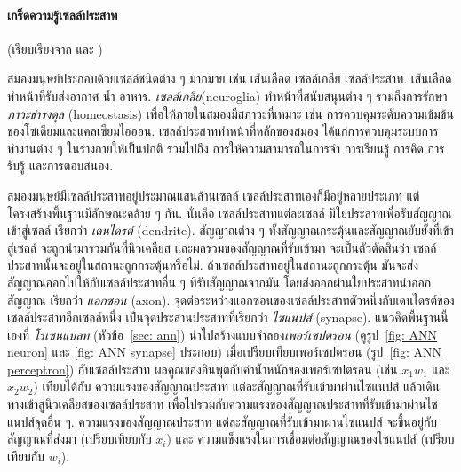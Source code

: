 {\small
	\begin{shaded}
\paragraph{\small เกร็ดความรู้เซลล์ประสาท}
(เรียบเรียงจาก \cite{BuddhasBrain} และ \cite{Wikipedia})
		
สมองมนุษย์ประกอบด้วยเซลล์ชนิดต่าง ๆ มากมาย
		เช่น 
		เส้นเลือด 
		เซลล์เกลีย
		เซลล์ประสาท.
		เส้นเลือดทำหน้าที่รับส่งอากาศ น้ำ อาหาร.
		\textit{เซลล์เกลีย}(neuroglia) ทำหน้าที่สนับสนุนต่าง ๆ รวมถึงการรักษา\textit{ภาวะธำรงดุล} (homeostasis) เพื่อให้ภายในสมองมีสภาวะที่เหมาะ เช่น การควบคุมระดับความเข้มข้นของโซเดียมและแคลเซียมไอออน.
		เซลล์ประสาททำหน้าที่หลักของสมอง ได้แก่การควบคุมระบบการทำงานต่าง ๆ ในร่างกายให้เป็นปกติ 
		รวมไปถึง การให้ความสามารถในการจำ การเรียนรู้ การคิด การรับรู้ และการตอบสนอง.
		
		สมองมนุษย์มีเซลล์ประสาทอยู่ประมาณแสนล้านเซลล์ 
		เซลล์ประสาทเองก็มีอยู่หลายประเภท แต่โครงสร้างพื้นฐานมีลักษณะคล้าย ๆ กัน.
		นั่นคือ
		เซลล์ประสาทแต่ละเซลล์
		มีใยประสาทเพื่อรับสัญญาณเข้าสู่เซลล์
		เรียกว่า \textit{เดนไดรต์} (dendrite).
		สัญญาณต่าง ๆ 
		ทั้งสัญญาณกระตุ้นและสัญญาณยับยั้งที่เข้าสู่เซลล์
		จะถูกนำมารวมกันที่นิวเคลียส
		และผลรวมของสัญญาณที่รับเข้ามา  
		จะเป็นตัวตัดสินว่า
		เซลล์ประสาทนั้นจะอยู่ในสถานะถูกกระตุ้นหรือไม่.
		ถ้าเซลล์ประสาทอยู่ในสถานะถูกกระตุ้น มันจะส่งสัญญาณออกไปให้กับเซลล์ประสาทอื่น ๆ ที่รับสัญญาณจากมัน
		โดยส่งออกผ่านใยประสาทนำออกสัญญาณ
		เรียกว่า \textit{แอกซอน} (axon). 
		จุดต่อระหว่างแอกซอนของเซลล์ประสาทตัวหนึ่งกับเดนไดรต์ของเซลล์ประสาทอีกเซลล์หนึ่ง 
		เป็นจุดประสานประสาทที่เรียกว่า \textit{ไซแนปส์} (synapse).
		แนวคิดพื้นฐานนี้เองที่ \textit{โรเซนแบลท} (หัวข้อ~\ref{sec: ann}) นำไปสร้างแบบจำลอง\textit{เพอร์เซปตรอน} (ดูรูป~\ref{fig: ANN neuron} และ \ref{fig: ANN synapse} ประกอบ)
		เมื่อเปรียบเทียบเพอร์เซปตรอน (รูป~\ref{fig: ANN perceptron})
		กับเซลล์ประสาท ผลคูณของอินพุตกับค่าน้ำหนักของเพอร์เซปตรอน (เช่น $x_1 w_1$ และ $x_2 w_2$) เทียบได้กับ ความแรงของสัญญาณประสาท แต่ละสัญญาณที่รับเข้ามาผ่านไซแนปส์
		แล้วเดินทางเข้าสู่นิวเคลียสของเซลล์ประสาท
		เพื่อไปรวมกับความแรงของสัญญาณประสาทที่รับเข้ามาผ่านไซแนปส์จุดอื่น ๆ.
		ความแรงของสัญญาณประสาท แต่ละสัญญาณที่รับเข้ามาผ่านไซแนปส์ จะขึ้นอยู่กับ
		สัญญาณที่ส่งมา (เปรียบเทียบกับ $x_i$) และ ความแข็งแรงในการเชื่อมต่อสัญญาณของไซแนปส์ (เปรียบเทียบกับ $w_i$).
		

\end{shaded}}
